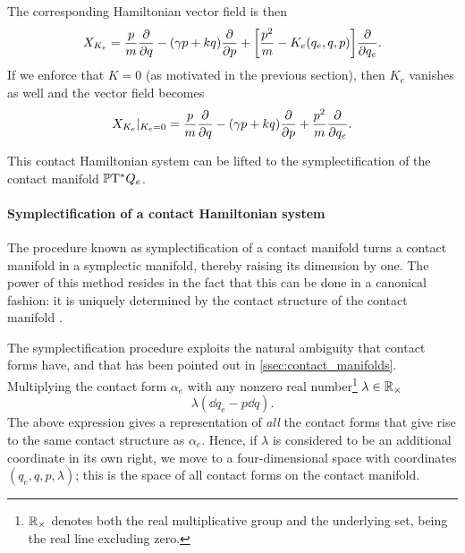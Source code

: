 The corresponding Hamiltonian vector field is then
\begin{equation}
    X_{K_e} = \frac{p}{m}\pdv{}{q} - (\gamma p + kq) \pdv{}{p} + \qty[\frac{p^2}{m} - K_e(q_e, q, p)]\pdv{}{q_e}. 
    \label{eq:ham_vf_e}
\end{equation}
If we enforce that \(K = 0\) (as motivated in the previous section), then \(K_e\) vanishes as well and the vector field becomes 
\begin{equation}
    X_{K_e}\vert_{K_e = 0} = \frac{p}{m}\pdv{}{q} - (\gamma p + kq) \pdv{}{p} + \frac{p^2}{m}\pdv{}{q_e}.
    \label{eq:ham_vf_e_liouville}
\end{equation}

This contact Hamiltonian system can be lifted to the symplectification of the contact manifold \(\mathbb{P}\mathrm{T}^* Q_e\).

\paragraph{Symplectification of a contact Hamiltonian system} The procedure known as symplectification of a contact manifold turns a contact manifold in a symplectic manifold, thereby raising its dimension by one. The power of this method resides in the fact that this can be done in a canonical fashion: it is uniquely determined by the contact structure of the contact manifold \cite{Arnold1989}.

The symplectification procedure exploits the natural ambiguity that contact forms have, and that has been pointed out in \cref{ssec:contact_manifolds}. Multiplying the contact form \(\alpha_e\) with any nonzero real number\footnote
{
    \(\mathbb{R}_{\times}\) denotes both the real multiplicative group and the underlying set, being the real line excluding zero. 
} \(\lambda \in \mathbb{R}_{\times}\)
\begin{equation}
    \lambda (\dd{q_e} - p \dd{q}). 
    \label{eq:lambda_alpha}
\end{equation}
The above expression gives a representation of \emph{all} the contact forms that give rise to the same contact structure as \(\alpha_e\). Hence, if \(\lambda\) is considered to be an additional coordinate in its own right, we move to a four-dimensional space with coordinates \((q_e, q, p, \lambda)\); this is the space of all contact forms on the contact manifold. 


